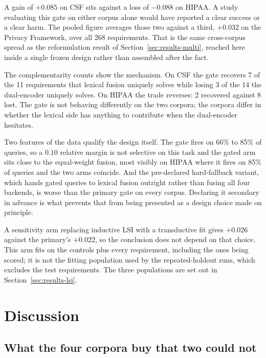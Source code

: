 \documentclass[a4paper,fleqn]{cas-sc}
\begin{document}
A gain of $+0.085$ on CSF sits against a loss of $-0.088$ on HIPAA. A study evaluating this gate on either corpus alone would have reported a clear success or a clear harm. The pooled figure averages those two against a third, $+0.032$ on the Privacy Framework, over all 268 requirements. That is the same cross-corpus spread as the reformulation result of Section~\ref{sec:results-multi}, reached here inside a single frozen design rather than assembled after the fact.

The complementarity counts show the mechanism. On CSF the gate recovers 7 of the 11 requirements that lexical fusion uniquely solves while losing 3 of the 14 the dual-encoder uniquely solves. On HIPAA the trade reverses: 2 recovered against 8 lost. The gate is not behaving differently on the two corpora; the corpora differ in whether the lexical side has anything to contribute when the dual-encoder hesitates.

Two features of the data qualify the design itself. The gate fires on 66\% to 85\% of queries, so a $0.10$ relative margin is not selective on this task and the gated arm sits close to the equal-weight fusion, most visibly on HIPAA where it fires on 85\% of queries and the two arms coincide. And the pre-declared hard-fallback variant, which hands gated queries to lexical fusion outright rather than fusing all four backends, is worse than the primary gate on every corpus. Declaring it secondary in advance is what prevents that from being presented as a design choice made on principle.

A sensitivity arm replacing inductive LSI with a transductive fit gives $+0.026$ against the primary's $+0.022$, so the conclusion does not depend on that choice. This arm fits on the controls plus every requirement, including the ones being scored; it is not the fitting population used by the repeated-holdout runs, which excludes the test requirements. The three populations are set out in Section~\ref{sec:results-lsi}.

\section{Discussion}
\label{sec:discussion}

\subsection{What the four corpora buy that two could not}
\end{document}
